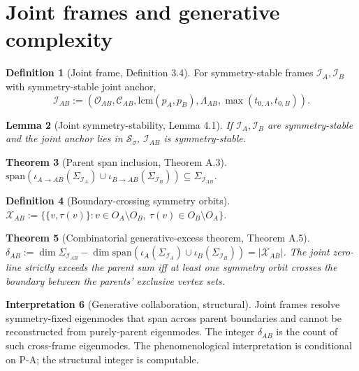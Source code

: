 \documentclass[11pt]{article}
\theoremstyle{plain}
\newtheorem{theorem}{Theorem}[section]
\newtheorem{lemma}[theorem]{Lemma}
\theoremstyle{definition}
\newtheorem{definition}[theorem]{Definition}
\newtheorem{interpretation}[theorem]{Interpretation}
\theoremstyle{remark}
\newcommand{\Ical}{\mathcal{I}}
\newcommand{\Ocal}{\mathcal{O}}
\newcommand{\Ccal}{\mathcal{C}}
\newcommand{\Xcal}{\mathcal{X}}
\begin{document}
\section{Joint frames and generative complexity}\label{sec:joint}

\begin{definition}[Joint frame, \citet{JointObserverInstance} Definition 3.4]\label{def:joint-frame}
For symmetry-stable frames $\Ical_A, \Ical_B$ with symmetry-stable joint anchor,
\[
  \Ical_{AB} := (\Ocal_{AB}, \Ccal_{AB}, \mathrm{lcm}(p_A, p_B), \Lambda_{AB}, \max(t_{0,A}, t_{0,B})).
\]
\end{definition}

\begin{lemma}[Joint symmetry-stability, \citet{JointObserverInstance} Lemma 4.1]\label{lem:joint-sigma}
If $\Ical_A, \Ical_B$ are symmetry-stable and the joint anchor lies in $\mathcal{S}_\sigma$, $\Ical_{AB}$ is symmetry-stable.
\end{lemma}

\begin{theorem}[Parent span inclusion, \citet{JointObserverInstance} Theorem A.3]\label{thm:span-inclusion}
$\mathrm{span}(\iota_{A \to AB}(\Sigma_{\Ical_A}) \cup \iota_{B \to AB}(\Sigma_{\Ical_B})) \subseteq \Sigma_{\Ical_{AB}}$.
\end{theorem}

\begin{definition}[Boundary-crossing symmetry orbits]
$\Xcal_{AB} := \{ \{v, \tau(v)\} : v \in O_A \setminus O_B,\ \tau(v) \in O_B \setminus O_A \}.$
\end{definition}

\begin{theorem}[Combinatorial generative-excess theorem, \citet{JointObserverInstance} Theorem A.5]\label{thm:generative-excess}
$\delta_{AB} := \dim \Sigma_{\Ical_{AB}} - \dim \mathrm{span}(\iota_A(\Sigma_{\Ical_A}) \cup \iota_B(\Sigma_{\Ical_B})) = |\Xcal_{AB}|$. The joint zero-line strictly exceeds the parent sum iff at least one symmetry orbit crosses the boundary between the parents' exclusive vertex sets.
\end{theorem}

\begin{interpretation}[Generative collaboration, structural]\label{int:generative-collaboration}
Joint frames resolve symmetry-fixed eigenmodes that span across parent boundaries and cannot be reconstructed from purely-parent eigenmodes. The integer $\delta_{AB}$ is the count of such cross-frame eigenmodes. The phenomenological interpretation is conditional on P-A; the structural integer is computable.
\end{interpretation}
\end{document}
